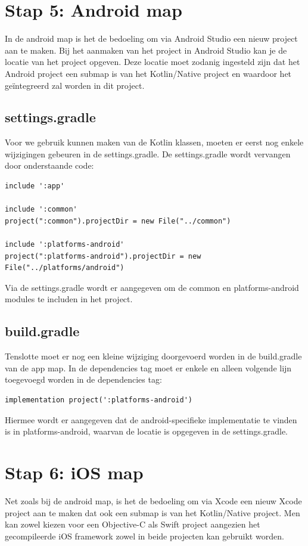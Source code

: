 \section{Stap 5: Android map}
In de android map is het de bedoeling om via Android Studio een nieuw project aan te maken. Bij het aanmaken van het project in Android Studio kan je de locatie van het project opgeven. Deze locatie moet zodanig ingesteld zijn dat het Android project een submap is van het Kotlin/Native project en waardoor het geïntegreerd zal worden in dit project.

\subsection{settings.gradle}
Voor we gebruik kunnen maken van de Kotlin klassen, moeten er eerst nog enkele wijzigingen gebeuren in de settings.gradle. De settings.gradle wordt vervangen door onderstaande code:

\begin{lstlisting}
include ':app'

include ':common'
project(":common").projectDir = new File("../common")

include ':platforms-android'
project(":platforms-android").projectDir = new File("../platforms/android")
\end{lstlisting}

Via de settings.gradle wordt er aangegeven om de common en platforms-android modules te includen in het project.

\subsection{build.gradle}
Tenslotte moet er nog een kleine wijziging doorgevoerd worden in de build.gradle van de app map. In de dependencies tag moet er enkele en alleen volgende lijn toegevoegd worden in de dependencies tag:

\begin{lstlisting}
implementation project(':platforms-android')
\end{lstlisting}

Hiermee wordt er aangegeven dat de android-specifieke implementatie te vinden is in platforms-android, waarvan de locatie is opgegeven in de settings.gradle. 

\section{Stap 6: iOS map}
\label{sec:ios-stap6}
Net zoals bij de android map, is het de bedoeling om via Xcode een nieuw Xcode project aan te maken dat ook een submap is van het Kotlin/Native project. Men kan zowel kiezen voor een Objective-C als Swift project aangezien het gecompileerde iOS framework zowel in beide projecten kan gebruikt worden.

